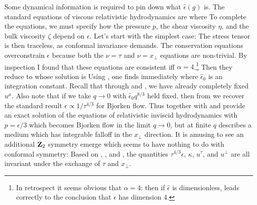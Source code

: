 \documentclass[12pt]{article}
\begin{document}
Some dynamical information is required to pin down what $\hat\epsilon(g)$ is.  The standard equations of viscous relativistic hydrodynamics are
where
To complete the equations, we must specify how the pressure $p$, the shear viscosity $\eta$, and the bulk viscosity $\zeta$ depend on $\epsilon$.  Let's start with the simplest case:
The stress tensor is then traceless, as conformal invariance demands.  The conservation equations  overconstrain $\epsilon$ because both the $\nu=\tau$ and $\nu=x_\perp$ equations are non-trivial.  By inspection I found that these equations are consistent iff $\alpha=4$.\footnote{In retrospect it seems obvious that $\alpha=4$: then if $\hat\epsilon$ is dimensionless,  leads correctly to the conclusion that $\epsilon$ has dimension $4$.}  Then they reduce to
whose solution is
Using , one finds immediately
where $\hat\epsilon_0$ is an integration constant.  Recall that through  and , we have already completely fixed $u^\mu$.  Also note that if we take $q \to 0$ with $\hat\epsilon_0 q^{8/3}$ held fixed, then from  we recover the standard result $\epsilon \propto 1/\tau^{4/3}$ for Bjorken flow.  Thus  together with  and  provide an exact solution of the equations of relativistic inviscid hydrodynamics with $p=\epsilon/3$ which becomes Bjorken flow in the limit $q \to 0$, but at finite $q$ describes a medium which has integrable falloff in the $x_\perp$ direction.  It is amusing to see an additional ${\bf Z}_2$ symmetry emerge which seems to have nothing to do with conformal symmetry: Based on , , and , the quantities $\tau^{4/3} \epsilon$, $\kappa$, $u^\tau$, and $u^\perp$ are all invariant under the exchange of $\tau$ and $x_\perp$.
\end{document}
